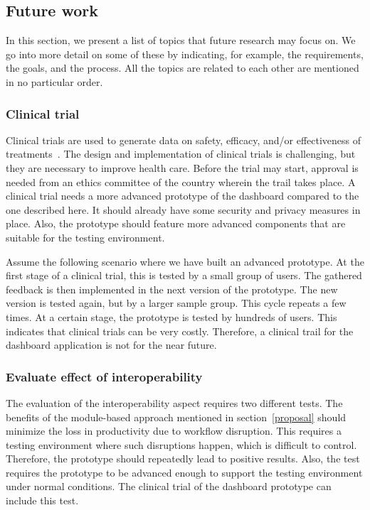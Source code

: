     \subsection{Future work}\label{future_work}

    In this section, we present a list of topics that future research may focus on. We go into more detail on some of these by indicating, for example, the requirements, the goals, and the process. All the topics are related to each other are mentioned in no particular order.

    \subsubsection{Clinical trial}

    Clinical trials are used to generate data on safety, efficacy, and/or effectiveness of treatments~\cite{Minneci2018}. The design and implementation of clinical trials is challenging, but they are necessary to improve health care. Before the trial may start, approval is needed from an ethics committee of the country wherein the trail takes place. A clinical trial needs a more advanced prototype of the dashboard compared to the one described here. It should already have some security and privacy measures in place. Also, the prototype should feature more advanced components that are suitable for the testing environment.

    Assume the following scenario where we have built an advanced prototype. At the first stage of a clinical trial, this is tested by a small group of users. The gathered feedback is then implemented in the next version of the prototype. The new version is tested again, but by a larger sample group. This cycle repeats a few times. At a certain stage, the prototype is tested by hundreds of users. This indicates that clinical trials can be very costly. Therefore, a clinical trail for the dashboard application is not for the near future.

    \subsubsection{Evaluate effect of interoperability}

    The evaluation of the interoperability aspect requires two different tests. The benefits of the module-based approach mentioned in section~\ref{proposal} should minimize the loss in productivity due to workflow disruption. This requires a testing environment where such disruptions happen, which is difficult to control. Therefore, the prototype should repeatedly lead to positive results. Also, the test requires the prototype to be advanced enough to support the testing environment under normal conditions. The clinical trial of the dashboard prototype can include this test.

